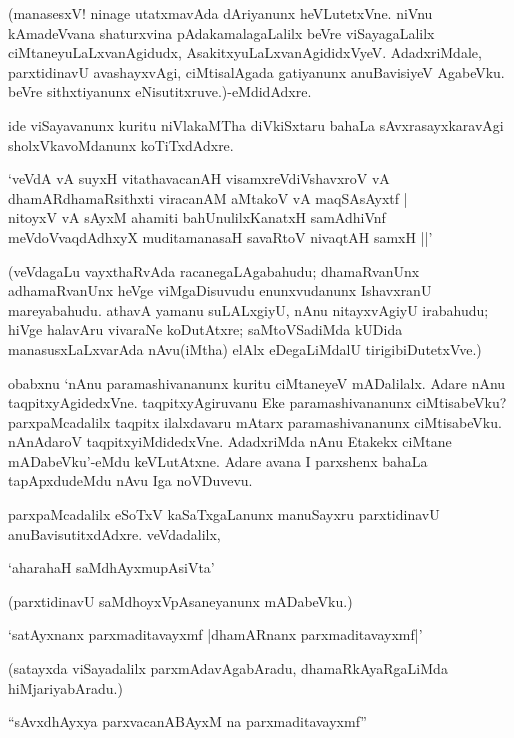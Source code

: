 (manasesxV! ninage utatxmavAda dAriyanunx heVLutetxVne. niVnu kAmadeVvana shaturxvina pAdakamalagaLalilx beVre viSayagaLalilx ciMtaneyuLaLxvanAgidudx, AsakitxyuLaLxvanAgididxVyeV. AdadxriMdale, parxtidinavU avashayxvAgi, ciMtisalAgada gatiyanunx anuBavisiyeV AgabeVku. beVre sithxtiyanunx eNisutitxruve.)-eMdidAdxre.

ide viSayavanunx kuritu niVlakaMTha diVkiSxtaru bahaLa sAvxrasayxkaravAgi sholxVkavoMdanunx koTiTxdAdxre.

\begin{shloka}
`veVdA vA suyxH vitathavacanAH visamxreVdiVshavxroV vA\\
dhamARdhamaRsithxti viracanAM aMtakoV vA maqSAsAyxtf |\\
nitoyxV vA sAyxM ahamiti bahUnulilxKanatxH samAdhiVnf\\
meVdoVvaqdAdhxyX muditamanasaH savaRtoV nivaqtAH samxH ||'
\end{shloka}

(veVdagaLu vayxthaRvAda racanegaLAgabahudu; dhamaRvanUnx adhamaRvanUnx heVge viMgaDisuvudu enunxvudanunx IshavxranU mareyabahudu. athavA yamanu suLALxgiyU, nAnu nitayxvAgiyU irabahudu; hiVge halavAru vivaraNe koDutAtxre; saMtoVSadiMda kUDida manasusxLaLxvarAda nAvu(iMtha) elAlx eDegaLiMdalU tirigibiDutetxVve.)

obabxnu `nAnu paramashivananunx kuritu ciMtaneyeV mADalilalx. Adare nAnu taqpitxyAgidedxVne. taqpitxyAgiruvanu Eke paramashivananunx ciMtisabeVku? parxpaMcadalilx taqpitx ilalxdavaru mAtarx paramashivananunx ciMtisabeVku. nAnAdaroV taqpitxyiMdidedxVne. AdadxriMda nAnu Etakekx ciMtane mADabeVku'-eMdu keVLutAtxne. Adare avana I parxshenx bahaLa tapApxdudeMdu nAvu Iga noVDuvevu.

parxpaMcadalilx eSoTxV kaSaTxgaLanunx manuSayxru parxtidinavU anuBavisutitxdAdxre. veVdadalilx,

\begin{shloka}
`aharahaH saMdhAyxmupAsiVta'
\end{shloka}

(parxtidinavU saMdhoyxVpAsaneyanunx mADabeVku.)

\begin{shloka}
`satAyxnanx parxmaditavayxmf |dhamARnanx parxmaditavayxmf|'
\end{shloka}

(satayxda viSayadalilx parxmAdavAgabAradu, dhamaRkAyaRgaLiMda hiMjariyabAradu.)

\begin{shloka}
``sAvxdhAyxya parxvacanABAyxM na parxmaditavayxmf''
\end{shloka}

